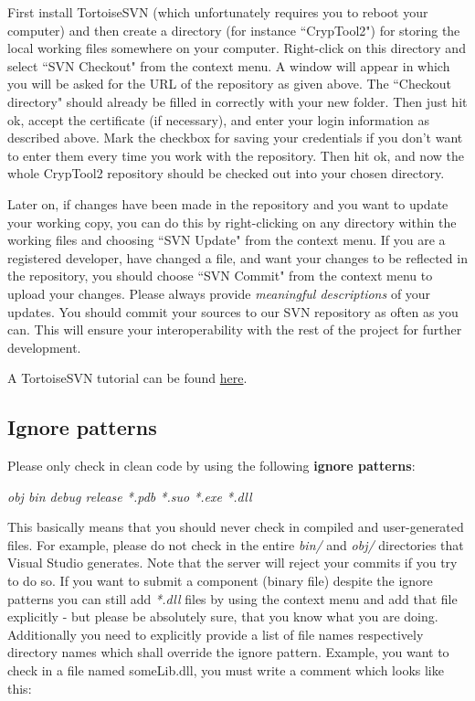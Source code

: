 First install TortoiseSVN (which unfortunately requires you to reboot your computer) and then create a directory (for instance ``CrypTool2") for storing the local working files somewhere on your computer. Right-click on this directory and select ``SVN Checkout" from the context menu. A window will appear in which you will be asked for the URL of the repository as given above. The ``Checkout directory" should already be filled in correctly with your new folder. Then just hit ok, accept the certificate (if necessary), and enter your login information as described above. Mark the checkbox for saving your credentials if you don't want to enter them every time you work with the repository. Then hit ok, and now the whole CrypTool2 repository should be checked out into your chosen directory.

Later on, if changes have been made in the repository and you want to update your working copy, you can do this by right-clicking on any directory within the working files and choosing ``SVN Update" from the context menu. If you are a registered developer, have changed a file, and want your changes to be reflected in the repository, you should choose ``SVN Commit" from the context menu to upload your changes. Please always provide \textit{meaningful descriptions} of your updates. You should commit your sources to our SVN repository as often as you can. This will ensure your interoperability with the rest of the project for further development.

A TortoiseSVN tutorial can be found \href{http://www.mind.ilstu.edu/research/robots/iris4/developers/svntutorial}{here}.

\subsection*{Ignore patterns}
\label{IgnorePatterns}

Please only check in clean code by using the following \textbf{ignore patterns}:

\begin{center}
\textit{obj bin debug release *.pdb *.suo *.exe *.dll}
\end{center}

This basically means that you should never check in compiled and user-generated files. For example, please do not check in the entire \textit{bin/} and \textit{obj/} directories that Visual Studio generates. Note that the server will reject your commits if you try to do so. If you want to submit a component (binary file) despite the ignore patterns you can still add \textit{*.dll} files by using the context menu and add that file explicitly - but please be absolutely sure, that you know what you are doing. Additionally you need to explicitly provide a list of file names respectively directory names which shall override the ignore pattern. Example, you want to check in a file named someLib.dll, you must write a comment which looks like this:

